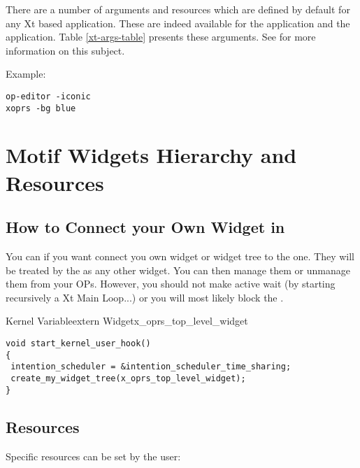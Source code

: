 There are a number of arguments and resources which are defined by default for
any Xt based application. These are indeed available for the \XOPRS{}
application and the \OPE{} application. Table \ref{xt-args-table} presents
these arguments. See \cite{Xt-manual} for more information on this subject.

Example:
\begin{verbatim}
op-editor -iconic
xoprs -bg blue
\end{verbatim}

\section{\XOPRS{} Motif Widgets Hierarchy and Resources}



\subsection{How to Connect your Own Widget in \XOPRS{}}

You can if you want connect you own widget or widget tree to the \XOPRS{} one.
They will be treated by the \XPK{} as any other widget. You can then manage
them or unmanage them from your OPs. However, you should not make active wait
(by starting recursively a Xt Main Loop...) or you will most likely block the
\XPK{}.

\begin{typevr}{Kernel Variable}{extern Widget}{x\_oprs\_top\_level\_widget}
\end{typevr}

\begin{verbatim}
void start_kernel_user_hook()
{
 intention_scheduler = &intention_scheduler_time_sharing;
 create_my_widget_tree(x_oprs_top_level_widget);
}
\end{verbatim}

\subsection{\XOPRS{} Resources}

Specific \XOPRS{} resources can be set by the user:

